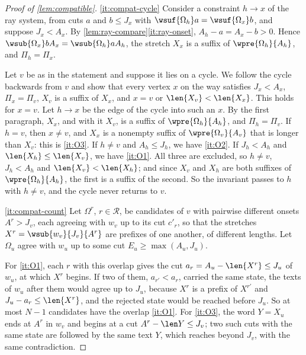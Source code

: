\begin{proof}[Proof of \cref{lem:compatible}]
\eqref{it:compat-cycle} Consider a constraint $h\to x$ of the ray system,
from cuts $a$ and $b\le J_x$ with $\wsuf{\Omega_h}a=\wsuf{\Omega_x}b$, and
suppose $J_x<A_x$. By \cref{lem:ray-compare}\eqref{it:ray-onset},
$A_h-a=A_x-b>0$. Hence $\wsub{\Omega_x}b{A_x}=\wsub{\Omega_h}a{A_h}$, the
stretch $X_x$ is a suffix of $\wpre{\Omega_h}{A_h}$, and $\Pi_h=\Pi_x$.

Let $v$ be as in the statement and suppose it lies on a cycle. We follow the
cycle backwards from $v$ and show that every vertex $x$ on the way satisfies
$J_x<A_x$, $\Pi_x=\Pi_v$, $X_v$ is a suffix of $X_x$, and $x=v$ or
$\len{X_v}<\len{X_x}$. This holds for $x=v$. Let $h\to x$ be the edge of the
cycle into such an $x$. By the first paragraph, $X_x$, and with it $X_v$, is
a suffix of $\wpre{\Omega_h}{A_h}$, and $\Pi_h=\Pi_v$. If $h=v$, then $x\ne
v$, and $X_x$ is a nonempty suffix of $\wpre{\Omega_v}{A_v}$ that is longer
than $X_v$: this is \ref{it:O3}. If $h\ne v$ and $A_h\le J_h$, we have
\ref{it:O2}. If $J_h<A_h$ and $\len{X_h}\le\len{X_v}$, we have \ref{it:O1}.
All three are excluded, so $h\ne v$, $J_h<A_h$ and $\len{X_v}<\len{X_h}$;
and since $X_v$ and $X_h$ are both suffixes of $\wpre{\Omega_h}{A_h}$, the
first is a suffix of the second. So the invariant passes to $h$ with $h\ne
v$, and the cycle never returns to $v$.

\eqref{it:compat-count} Let $\Omega^r$, $r\in\mathcal R$, be candidates of
$v$ with pairwise different onsets $A^r>J_v$, each agreeing with $w_v$ up to
its cut $c'_r$, so that the stretches $X^r=\wsub{w_v}{J_v}{A^r}$ are
prefixes of one another, of different lengths. Let $\Omega_u$ agree with
$w_u$ up to some cut $E_u\ge\max(A_u,J_u)$.

For \ref{it:O1}, each $r$ with this overlap gives the cut
$a_r=A_u-\len{X^r}\le J_u$ of $w_u$, at which $X^r$ begins. If two of them,
$a_{r'}<a_r$, carried the same state, the texts of $w_u$ after them would
agree up to $J_u$, because $X^r$ is a prefix of $X^{r'}$ and $J_u-a_r\le
\len{X^r}$, and the rejected state would be reached before $J_u$. So at most
$N-1$ candidates have the overlap \ref{it:O1}. For \ref{it:O3}, the word
$Y=X_u$ ends at $A^r$ in $w_v$ and begins at a cut $A^r-\len Y\le J_v$; two
such cuts with the same state are followed by the same text $Y$, which
reaches beyond $J_v$, with the same contradiction.


\end{proof}
